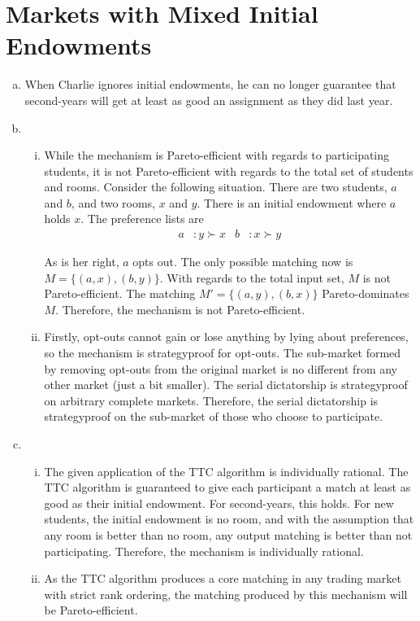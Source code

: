 \documentclass[12pt]{article}
\begin{document}
\section{Markets with Mixed Initial Endowments}
\begin{enumerate}[(a)]
\item When Charlie ignores initial endowments, he can no longer guarantee that second-years will get at least as good an assignment as they did last year.

\item 
\begin{enumerate}[i.]
\item While the mechanism is Pareto-efficient with regards to participating students, it is not Pareto-efficient with regards to the total set of students and rooms. Consider the following situation. There are two students, $a$ and $b$, and two rooms, $x$ and $y$. There is an initial endowment where $a$ holds $x$. The preference lists are
\begin{align*}
a &: y \succ x & b &: x \succ y
\end{align*}

As is her right, $a$ opts out. The only possible matching now is $M = \{(a, x),  (b, y)\}$. With regards to the total input set, $M$ is not Pareto-efficient. The matching $M' = \{(a, y),  (b, x)\}$ Pareto-dominates $M$. Therefore, the mechanism is not Pareto-efficient.

\item Firstly, opt-outs cannot gain or lose anything by lying about preferences, so the mechanism is strategyproof for opt-outs. The sub-market formed by removing opt-outs from the original market is no different from any other market (just a bit smaller). The serial dictatorship is strategyproof on arbitrary complete markets. Therefore, the serial dictatorship is strategyproof on the sub-market of those who choose to participate.
\end{enumerate}

\item 
\begin{enumerate}[i.]
\item The given application of the TTC algorithm is individually rational. The TTC algorithm is guaranteed to give each participant a match at least as good as their initial endowment. For second-years, this holds. For new students, the initial endowment is no room, and with the assumption that any room is better than no room, any output matching is better than not participating. Therefore, the mechanism is individually rational.

\item As the TTC algorithm produces a core matching in any trading market with strict rank ordering, the matching produced by this mechanism will be Pareto-efficient.
\end{enumerate}
\end{enumerate}
\end{document}
